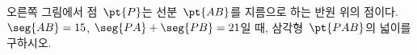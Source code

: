 \noindent\begin{minipage}[t]{0.58\linewidth}\vspace{0pt}\raggedright 오른쪽 그림에서 점~$\pt{P}$는 선분~$\pt{AB}$를 지름으로 하는 반원 위의 점이다. $\seg{AB}=15$, $\seg{PA}+\seg{PB}=21$일 때, 삼각형~$\pt{PAB}$의 넓이를 구하시오.\end{minipage}\hfill\begin{minipage}[t]{0.4\linewidth}\vspace{0pt}\centering \resizebox{\ifdim\width>\linewidth\linewidth\else\width\fi}{!}{}\end{minipage}\par
